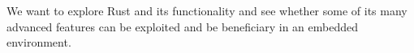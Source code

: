 We want to explore Rust and its functionality and see whether some of its many advanced features
can be exploited and be beneficiary in an embedded environment.